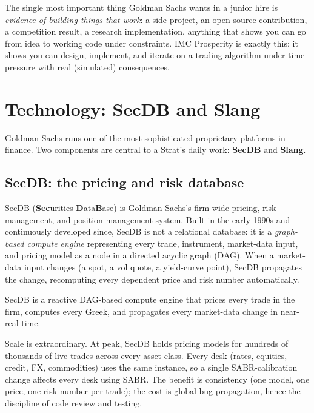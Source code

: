 \begin{intuitionbox}
The single most important thing Goldman Sachs wants in a junior hire
is \emph{evidence of building things that work}: a side project, an
open-source contribution, a competition result, a research
implementation, anything that shows you can go from idea to
working code under constraints.  IMC Prosperity is exactly this: it
shows you can design, implement, and iterate on a trading algorithm
under time pressure with real (simulated) consequences.
\end{intuitionbox}

\section{Technology: SecDB and Slang}
\label{sec:strats_secdb}

Goldman Sachs runs one of the most sophisticated proprietary
platforms in finance.  Two components are central to a Strat's daily
work: \textbf{SecDB} and \textbf{Slang}.

\subsection{SecDB: the pricing and risk database}

SecDB (\textbf{Sec}urities \textbf{D}ata\textbf{B}ase) is Goldman
Sachs's firm-wide pricing, risk-management, and position-management
system.  Built in the early 1990s and continuously developed since,
SecDB is not a relational database: it is a \emph{graph-based
compute engine} representing every trade, instrument, market-data
input, and pricing model as a node in a directed acyclic graph
(DAG).  When a market-data input changes (a spot, a vol quote, a
yield-curve point), SecDB propagates the change, recomputing
every dependent price and risk number automatically.

\begin{keyfactbox}
SecDB is a reactive DAG-based compute engine that prices every trade
in the firm, computes every Greek, and propagates every market-data
change in near-real time.
\end{keyfactbox}

Scale is extraordinary.  At peak, SecDB holds pricing models for
hundreds of thousands of live trades across every asset class.
Every desk (rates, equities, credit, FX, commodities) uses the same
instance, so a single SABR-calibration change affects every desk
using SABR.  The benefit is consistency (one model, one price, one
risk number per trade); the cost is global bug propagation, hence
the discipline of code review and testing.

